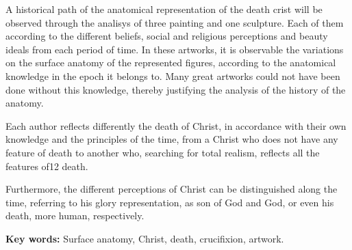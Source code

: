 A historical path of the anatomical representation of the death crist will be observed through the analisys of three painting and one sculpture. Each of them according to the different beliefs, social and religious perceptions and beauty ideals from each period of time.
In these artworks, it is observable the variations on the surface anatomy of the represented figures, according to the anatomical knowledge in the epoch it belongs to. Many great artworks could not have been done without this knowledge, thereby justifying the analysis of the history of the anatomy. 

Each author reflects differently the death of Christ, in accordance with their own knowledge and the principles of the time, from a Christ who does not have any feature of death to another who, searching for total realism, reflects all the features of12 death.

Furthermore, the different perceptions of Christ can be distinguished along the time, referring to his glory representation, as son of God and God, or even his death, more human, respectively.


\textbf{Key words:}
Surface anatomy, Christ, death, crucifixion, artwork.
